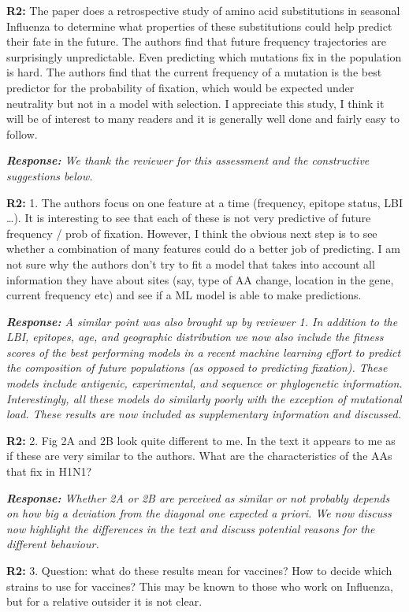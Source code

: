 \documentclass[aps,rmp,onecolumn]{revtex4-1}
\newcommand{\refb}[1]{\textbf{R2:} #1\vskip 5mm}
\newcommand{\response}[1]{{\it {\color{response}\textbf{Response:} #1}}\vskip 5mm}
\begin{document}
\refb{The paper does a retrospective study of amino acid substitutions in seasonal Influenza to determine what properties of these substitutions could help predict their fate in the future. The authors find that future frequency trajectories are surprisingly unpredictable. Even predicting which mutations fix in the population is hard. The authors find that the current frequency of a mutation is the best predictor for the probability of fixation, which would be expected under neutrality but not in a model with selection.
I appreciate this study, I think it will be of interest to many readers and it is generally well done and fairly easy to follow.
}

\response{We thank the reviewer for this assessment and the constructive suggestions below. }

\refb{1. The authors focus on one feature at a time (frequency, epitope status, LBI …). It is interesting to see that each of these is not very predictive of future frequency / prob of fixation. However, I think the obvious next step is to see whether a combination of many features could do a better job of predicting. I am not sure why the authors don’t try to fit a model that takes into account all information they have about sites (say, type of AA change, location in the gene, current frequency etc) and see if a ML model is able to make predictions. }

\response{
	A similar point was also brought up by reviewer 1.
	In addition to the LBI, epitopes, age, and geographic distribution we now also include the fitness scores of the best performing models in a recent machine learning effort to predict the composition of future populations (as opposed to predicting fixation).
	These models include antigenic, experimental, and sequence or phylogenetic information.
	Interestingly, all these models do similarly poorly with the exception of mutational load.
	These results are now included as supplementary information and discussed.
}

\refb{2. Fig 2A and 2B look quite different to me. In the text it appears to me as if these are very similar to the authors. What are the characteristics of the AAs that fix in H1N1? }

\response{Whether 2A or 2B are perceived as similar or not probably depends on how big a deviation from the diagonal one expected a priori.
We now discuss now highlight the differences in the text and discuss potential reasons for the different behaviour.  }

\refb{3. Question: what do these results mean for vaccines? How to decide which strains to use for vaccines? This may be known to those who work on Influenza, but for a relative outsider it is not clear. }
\end{document}
